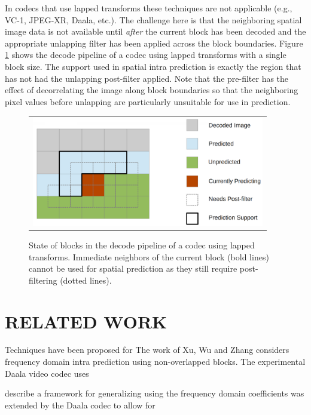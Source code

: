 \documentclass[a4paper]{spie}  %
\begin{document}
In codecs that use lapped transforms these techniques are not applicable (e.g.,
 VC-1, JPEG-XR, Daala, etc.).
The challenge here is that the neighboring spatial image data is not available
 until {\em after} the current block has been decoded and the appropriate
 unlapping filter has been applied across the block boundaries.
Figure \ref{fig:decode} shows the decode pipeline of a codec using lapped
 transforms with a single block size.
The support used in spatial intra prediction is exactly the region that has not
 had the unlapping post-filter applied.
Note that the pre-filter has the effect of decorrelating the image along block
 boundaries so that the neighboring pixel values before unlapping are
 particularly unsuitable for use in prediction.


\begin{figure}
\begin{center}
\begin{tabular}{c}
\includegraphics[natwidth=1376,natheight=646,width=4in]{daala_decode.png}
\end{tabular}
\end{center}
\caption[example]{\label{fig:decode} State of blocks in the decode pipeline of
 a codec using lapped transforms. Immediate neighbors of the current block
 (bold lines) cannot be used for spatial prediction as they still require post-
 filtering (dotted lines).}
\end{figure}

\section{RELATED WORK}

Techniques have been proposed for 
The work of Xu, Wu and Zhang considers frequency domain intra prediction using
 non-overlapped blocks\cite{xuwu2009}.
The experimental Daala video codec uses 

describe a framework for generalizing using the frequency domain coefficients was extended by the Daala codec to allow for 
\end{document}

